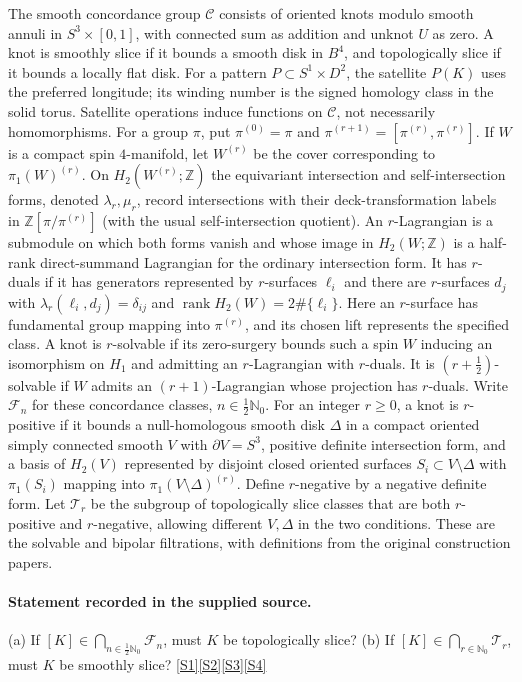 \documentclass[11pt]{article}
\newcommand{\sref}[2]{\hyperlink{source:#1:#2}{[S#2]}}
\begin{document}
The smooth concordance group $\mathcal C$ consists of oriented knots modulo smooth annuli in $S^3\times[0,1]$, with connected sum as addition and unknot $U$ as zero. A knot is smoothly slice if it bounds a smooth disk in $B^4$, and topologically slice if it bounds a locally flat disk. For a pattern $P\subset S^1\times D^2$, the satellite $P(K)$ uses the preferred longitude; its winding number is the signed homology class in the solid torus. Satellite operations induce functions on $\mathcal C$, not necessarily homomorphisms. For a group $\pi$, put $\pi^{(0)}=\pi$ and $\pi^{(r+1)}=[\pi^{(r)},\pi^{(r)}]$. If $W$ is a compact spin $4$-manifold, let $W^{(r)}$ be the cover corresponding to $\pi_1(W)^{(r)}$. On $H_2(W^{(r)};\mathbb Z)$ the equivariant intersection and self-intersection forms, denoted $\lambda_r,\mu_r$, record intersections with their deck-transformation labels in $\mathbb Z[\pi/\pi^{(r)}]$ (with the usual self-intersection quotient). An $r$-Lagrangian is a submodule on which both forms vanish and whose image in $H_2(W;\mathbb Z)$ is a half-rank direct-summand Lagrangian for the ordinary intersection form. It has $r$-duals if it has generators represented by $r$-surfaces $\ell_i$ and there are $r$-surfaces $d_j$ with $\lambda_r(\ell_i,d_j)=\delta_{ij}$ and $\operatorname{rank}H_2(W)=2\#\{\ell_i\}$. Here an $r$-surface has fundamental group mapping into $\pi^{(r)}$, and its chosen lift represents the specified class. A knot is $r$-solvable if its zero-surgery bounds such a spin $W$ inducing an isomorphism on $H_1$ and admitting an $r$-Lagrangian with $r$-duals. It is $(r+\tfrac12)$-solvable if $W$ admits an $(r+1)$-Lagrangian whose projection has $r$-duals. Write $\mathcal F_n$ for these concordance classes, $n\in\tfrac12\mathbb N_0$. For an integer $r\geq0$, a knot is $r$-positive if it bounds a null-homologous smooth disk $\Delta$ in a compact oriented simply connected smooth $V$ with $\partial V=S^3$, positive definite intersection form, and a basis of $H_2(V)$ represented by disjoint closed oriented surfaces $S_i\subset V\setminus\Delta$ with $\pi_1(S_i)$ mapping into $\pi_1(V\setminus\Delta)^{(r)}$. Define $r$-negative by a negative definite form. Let $\mathcal T_r$ be the subgroup of topologically slice classes that are both $r$-positive and $r$-negative, allowing different $V,\Delta$ in the two conditions. These are the solvable and bipolar filtrations, with definitions from the original construction papers.
\paragraph{Statement recorded in the supplied source.}
(a) If $[K]\in\bigcap_{n\in\frac12\mathbb N_0}\mathcal F_n$, must $K$ be topologically slice? (b) If $[K]\in\bigcap_{r\in\mathbb N_0}\mathcal T_r$, must $K$ be smoothly slice? \sref{2703}{1}\sref{2703}{2}\sref{2703}{3}\sref{2703}{4}
\end{document}
